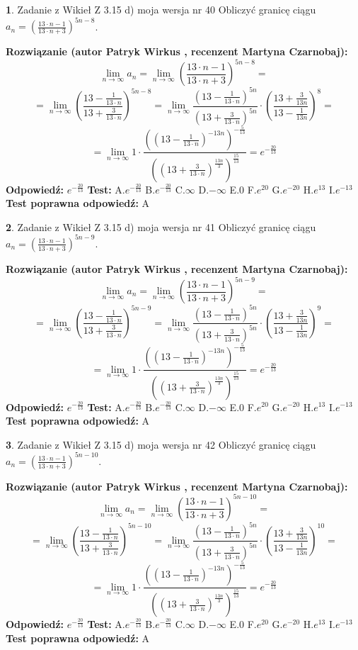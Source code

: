 \documentclass[12pt, a4paper]{article}
\theoremstyle{definition} %
\newtheorem{zad}{}
\newcommand{\zadStart}[1]{\begin{zad}#1\newline}
\newcommand{\zadStop}{\end{zad}}
\newcommand{\rozwStart}[2]{\noindent \textbf{Rozwiązanie (autor #1 , recenzent #2): }\newline}
\newcommand{\rozwStop}{\newline}
\newcommand{\odpStart}{\noindent \textbf{Odpowiedź:}\newline}
\newcommand{\odpStop}{\newline}
\newcommand{\testStart}{\noindent \textbf{Test:}\newline}
\newcommand{\testStop}{\newline}
\newcommand{\kluczStart}{\noindent \textbf{Test poprawna odpowiedź:}\newline}
\newcommand{\kluczStop}{\newline}
\begin{document}
\zadStart{Zadanie z Wikieł Z 3.15 d) moja wersja nr 40}
Obliczyć granicę ciągu $a_{n}=(\frac{13\cdot n - 1}{13 \cdot n + 3})^{5n-8}$.
\zadStop
\rozwStart{Patryk Wirkus}{Martyna Czarnobaj}
$$\lim\limits_{n\to\infty} a_{n} = \lim\limits_{n\to\infty}(\frac{13\cdot n - 1}{13 \cdot n + 3})^{5n-8}=$$
$$=\lim\limits_{n\to\infty}(\frac{13 - \frac{1}{13\cdot n}}{13 + \frac{3}{13 \cdot n}})^{5n-8}=\lim\limits_{n\to\infty}\frac{(13 - \frac{1}{13\cdot n})^{5n}}{(13 + \frac{3}{13\cdot n})^{5n}} \cdot (\frac{13+\frac{3}{13n}}{13-\frac{1}{13n}})^{8}=$$
$$=\lim\limits_{n\to\infty} 1 \cdot \frac{((13-\frac{1}{13 \cdot n})^{-13n})^{-\frac{5}{13}}}{((13+\frac{3}{13 \cdot n})^{\frac{13n}{3}})^{\frac{15}{13}}} =e^{-\frac{20}{13}}$$
\rozwStop
\odpStart
$e^{-\frac{20}{13}}$
\odpStop
\testStart
A.$ e^{-\frac{20}{13}}$
B.$ e^{-\frac{20}{13}}$
C.$\infty$
D.$-\infty$
E.$0$
F.$e^{20}$
G.$e^{-20}$
H.$e^{13}$
I.$e^{-13}$
\testStop
\kluczStart
A
\kluczStop



\zadStart{Zadanie z Wikieł Z 3.15 d) moja wersja nr 41}
Obliczyć granicę ciągu $a_{n}=(\frac{13\cdot n - 1}{13 \cdot n + 3})^{5n-9}$.
\zadStop
\rozwStart{Patryk Wirkus}{Martyna Czarnobaj}
$$\lim\limits_{n\to\infty} a_{n} = \lim\limits_{n\to\infty}(\frac{13\cdot n - 1}{13 \cdot n + 3})^{5n-9}=$$
$$=\lim\limits_{n\to\infty}(\frac{13 - \frac{1}{13\cdot n}}{13 + \frac{3}{13 \cdot n}})^{5n-9}=\lim\limits_{n\to\infty}\frac{(13 - \frac{1}{13\cdot n})^{5n}}{(13 + \frac{3}{13\cdot n})^{5n}} \cdot (\frac{13+\frac{3}{13n}}{13-\frac{1}{13n}})^{9}=$$
$$=\lim\limits_{n\to\infty} 1 \cdot \frac{((13-\frac{1}{13 \cdot n})^{-13n})^{-\frac{5}{13}}}{((13+\frac{3}{13 \cdot n})^{\frac{13n}{3}})^{\frac{15}{13}}} =e^{-\frac{20}{13}}$$
\rozwStop
\odpStart
$e^{-\frac{20}{13}}$
\odpStop
\testStart
A.$ e^{-\frac{20}{13}}$
B.$ e^{-\frac{20}{13}}$
C.$\infty$
D.$-\infty$
E.$0$
F.$e^{20}$
G.$e^{-20}$
H.$e^{13}$
I.$e^{-13}$
\testStop
\kluczStart
A
\kluczStop



\zadStart{Zadanie z Wikieł Z 3.15 d) moja wersja nr 42}
Obliczyć granicę ciągu $a_{n}=(\frac{13\cdot n - 1}{13 \cdot n + 3})^{5n-10}$.
\zadStop
\rozwStart{Patryk Wirkus}{Martyna Czarnobaj}
$$\lim\limits_{n\to\infty} a_{n} = \lim\limits_{n\to\infty}(\frac{13\cdot n - 1}{13 \cdot n + 3})^{5n-10}=$$
$$=\lim\limits_{n\to\infty}(\frac{13 - \frac{1}{13\cdot n}}{13 + \frac{3}{13 \cdot n}})^{5n-10}=\lim\limits_{n\to\infty}\frac{(13 - \frac{1}{13\cdot n})^{5n}}{(13 + \frac{3}{13\cdot n})^{5n}} \cdot (\frac{13+\frac{3}{13n}}{13-\frac{1}{13n}})^{10}=$$
$$=\lim\limits_{n\to\infty} 1 \cdot \frac{((13-\frac{1}{13 \cdot n})^{-13n})^{-\frac{5}{13}}}{((13+\frac{3}{13 \cdot n})^{\frac{13n}{3}})^{\frac{15}{13}}} =e^{-\frac{20}{13}}$$
\rozwStop
\odpStart
$e^{-\frac{20}{13}}$
\odpStop
\testStart
A.$ e^{-\frac{20}{13}}$
B.$ e^{-\frac{20}{13}}$
C.$\infty$
D.$-\infty$
E.$0$
F.$e^{20}$
G.$e^{-20}$
H.$e^{13}$
I.$e^{-13}$
\testStop
\kluczStart
A
\kluczStop
\end{document}
